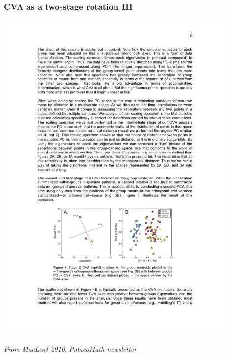 \documentclass{beamer}
\begin{document}
\begin{frame}
  \frametitle{CVA as a two-stage rotation III}

\begin{center}
\includegraphics[width=0.9\textwidth]{cva-as-rot3}
\end{center}

\hfill {\scriptsize \textit{From MacLeod 2010, PalaeoMath newsletter}}


\end{frame}
\end{document}
